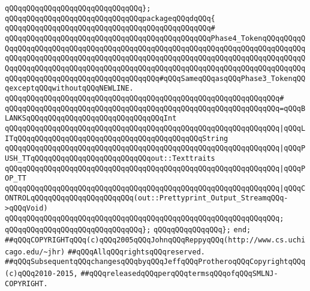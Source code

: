 \verb|qQQqqQQqqQQqqQQqqQQqqQQqqQQqqQQq};|\newline
\newline
\verb|qQQqqQQqqQQqqQQqqQQqqQQqqQQqqQQqpackageqQQqdqQQq{|\newline
\verb|qQQqqQQqqQQqqQQqqQQqqQQqqQQqqQQqqQQqqQQqqQQqqQQq#|\newline
\verb|qQQqqQQqqQQqqQQqqQQqqQQqqQQqqQQqqQQqqQQqqQQqqQQqPhase4_TokenqQQqqQQqqQQqqQQqqQQqqQQqqQQqqQQqqQQqqQQqqQQqqQQqqQQqqQQqqQQqqQQqqQQqqQQqqQQqqQQqqQQqqQQqqQQqqQQqqQQqqQQqqQQqqQQqqQQqqQQqqQQqqQQqqQQqqQQqqQQqqQQqqQQqqQQqqQQqqQQqqQQqqQQqqQQqqQQqqQQqqQQqqQQqqQQqqQQqqQQqqQQqqQQqqQQqqQQqqQQqqQQqqQQqqQQqqQQqqQQqqQQqqQQqqQQqqQQq#qQQqSameqQQqasqQQqPhase3_TokenqQQqexceptqQQqwithoutqQQqNEWLINE.|\newline
\verb|qQQqqQQqqQQqqQQqqQQqqQQqqQQqqQQqqQQqqQQqqQQqqQQqqQQqqQQqqQQqqQQq#|\newline
\verb|qQQqqQQqqQQqqQQqqQQqqQQqqQQqqQQqqQQqqQQqqQQqqQQqqQQqqQQqqQQqqQQq=qQQqBLANKSqQQqqQQqqQQqqQQqqQQqqQQqqQQqqQQqInt|\newline
\verb|qQQqqQQqqQQqqQQqqQQqqQQqqQQqqQQqqQQqqQQqqQQqqQQqqQQqqQQqqQQqqQQq|\verb#|qQQqLITqQQqqQQqqQQqqQQqqQQqqQQqqQQqqQQqqQQqqQQqqQQqString#\newline
\verb|qQQqqQQqqQQqqQQqqQQqqQQqqQQqqQQqqQQqqQQqqQQqqQQqqQQqqQQqqQQqqQQq|\verb#|qQQqPUSH_TTqQQqqQQqqQQqqQQqqQQqqQQqqQQqout::Texttraits#\newline
\verb|qQQqqQQqqQQqqQQqqQQqqQQqqQQqqQQqqQQqqQQqqQQqqQQqqQQqqQQqqQQqqQQq|\verb#|qQQqPOP_TT#\newline
\verb|qQQqqQQqqQQqqQQqqQQqqQQqqQQqqQQqqQQqqQQqqQQqqQQqqQQqqQQqqQQqqQQq|\verb#|qQQqCONTROLqQQqqQQqqQQqqQQqqQQqqQQq(out::Prettyprint_Output_StreamqQQq->qQQqVoid)#\newline
\verb|qQQqqQQqqQQqqQQqqQQqqQQqqQQqqQQqqQQqqQQqqQQqqQQqqQQqqQQqqQQqqQQq;|\newline
\verb|qQQqqQQqqQQqqQQqqQQqqQQqqQQqqQQq};|\newline
\verb|qQQqqQQqqQQqqQQq};|\newline
\verb|end;|\newline
\newline
\verb|##qQQqCOPYRIGHTqQQq(c)qQQq2005qQQqJohnqQQqReppyqQQq(http://www.cs.uchicago.edu/~jhr)|\newline
\verb|##qQQqAllqQQqrightsqQQqreserved.|\newline
\verb|##qQQqSubsequentqQQqchangesqQQqbyqQQqJeffqQQqProtheroqQQqCopyrightqQQq(c)qQQq2010-2015,|\newline
\verb|##qQQqreleasedqQQqperqQQqtermsqQQqofqQQqSMLNJ-COPYRIGHT.|\newline

